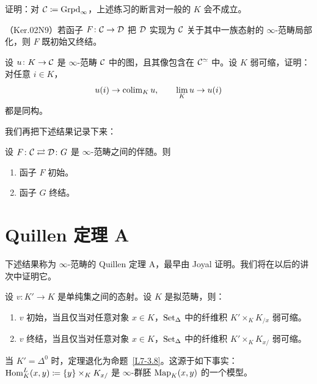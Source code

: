 \begin{exercise}\label{L7-3.21}
证明：对 $\mathcal{C}\coloneqq\operatorname{Grpd}_\infty$，上述练习的断言对一般的 $K$ 会不成立。
\end{exercise}

\begin{proposition}\label{L7-3.22}
（Ker.02N9）若函子 $F\colon\mathcal{C}\to\mathcal{D}$ 把 $\mathcal{D}$ 实现为 $\mathcal{C}$ 关于其中一族态射的 $\infty$-范畴局部化，则 $F$ 既初始又终结。
\end{proposition}

\begin{exercise}\label{L7-3.23}
设 $u\colon K\to\mathcal{C}$ 是 $\infty$-范畴 $\mathcal{C}$ 中的图，且其像包含在 $\mathcal{C}^{\simeq}$ 中。设 $K$ 弱可缩，证明：对任意 $i\in K$，
\[
u(i)\to\operatorname{colim}_K u,\qquad \lim_K u\to u(i)
\]
都是同构。
\end{exercise}

\nitem\label{L7-3.24} 我们再把下述结果记录下来：

\begin{theorem}\label{L7-3.25}
设 $F\colon\mathcal{C}\rightleftarrows\mathcal{D}\colon G$ 是 $\infty$-范畴之间的伴随。则
\begin{enumerate}[label=(\arabic*),leftmargin=2.4em,itemsep=0.1em]
\item 函子 $F$ 初始。
\item 函子 $G$ 终结。
\end{enumerate}
\end{theorem}

\section{Quillen 定理 A}

下述结果称为 $\infty$-范畴的 Quillen 定理 A，最早由 Joyal 证明。我们将在以后的讲次中证明它。

\begin{theorem}\label{L7-4.1}
设 $v\colon K'\to K$ 是单纯集之间的态射。设 $K$ 是拟范畴，则：
\begin{enumerate}[label=(\arabic*),leftmargin=2.4em,itemsep=0.1em]
\item $v$ 初始，当且仅当对任意对象 $x\in K$，$\operatorname{Set}_\Delta$ 中的纤维积 $K'\times_K K_{/x}$ 弱可缩。
\item $v$ 终结，当且仅当对任意对象 $x\in K$，$\operatorname{Set}_\Delta$ 中的纤维积 $K'\times_K K_{x/}$ 弱可缩。
\end{enumerate}
\end{theorem}

\begin{remark}\label{L7-4.2}
当 $K'=\Delta^0$ 时，定理退化为命题~\ref{L7-3.8}。这源于如下事实：$\operatorname{Hom}^L_K(x,y)\coloneqq\{y\}\times_K K_{x/}$ 是 $\infty$-群胚 $\operatorname{Map}_K(x,y)$ 的一个模型。
\end{remark}

